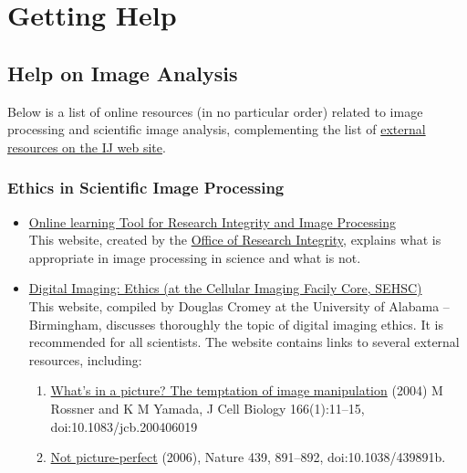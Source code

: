 \section{Getting Help\label{sec:Help-Resources}}


\subsection{Help on Image Analysis}

Below
is a list of online resources (in no particular order) related to
image processing and scientific image analysis, complementing the
list of \href{http://imagej.nih.gov/ij/links.html}{external resources on the IJ web site}. 


\subsubsection*{Ethics in Scientific Image Processing}
\begin{itemize}
\item \href{http://www.ori.dhhs.gov/education/products/RIandImages/default.html}{Online learning Tool for Research Integrity and Image Processing}\\
This website, created by the \href{http://ori.dhhs.gov/}{Office of Research Integrity},
explains what is appropriate in image processing in science and what
is not.
\item \href{http://swehsc.pharmacy.arizona.edu/exppath/micro/digimage_ethics.php}{Digital Imaging: Ethics (at the Cellular Imaging Facily Core, SEHSC)}\\
This website, compiled by Douglas Cromey at the University of Alabama
-- Birmingham, discusses thoroughly the topic of digital imaging ethics.
It is recommended for all scientists. The website contains links to
several external resources, including:\vspace{-8pt}


\begin{enumerate}
\item \href{http://www.jcb.org/cgi/reprint/166/1/11}{What's in a picture? The temptation of image manipulation}
(2004) M Rossner and K M Yamada, J Cell Biology 166(1):11--15, doi:10.1083/jcb.200406019
\item \href{http://www.nature.com/nature/journal/v439/n7079/full/439891b.html}{Not picture-perfect}
(2006), Nature 439, 891--892, doi:10.1038/439891b.
\end{enumerate}
\end{itemize}

